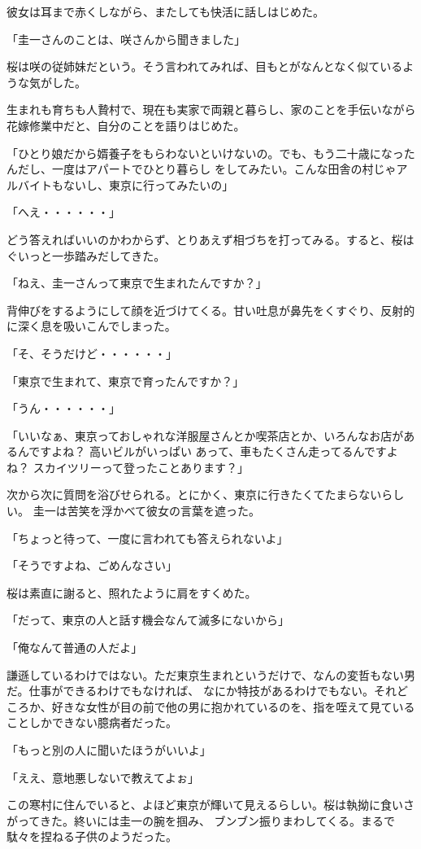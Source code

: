 ﻿\documentclass[book,tate]{jlreq}
\begin{document}
彼女は耳まで赤くしながら、またしても快活に話しはじめた。

「圭一さんのことは、咲さんから聞きました」

桜は咲の従姉妹だという。そう言われてみれば、目もとがなんとなく似ているような気がした。

生まれも育ちも人贄村で、現在も実家で両親と暮らし、家のことを手伝いながら花嫁修業中だと、自分のことを語りはじめた。

「ひとり娘だから婿養子をもらわないといけないの。でも、もう二十歳になったんだし、一度はアパートでひとり暮らし をしてみたい。こんな田舎の村じゃアルバイトもないし、東京に行ってみたいの」

「へえ・・・・・・」

どう答えればいいのかわからず、とりあえず相づちを打ってみる。すると、桜はぐいっと一歩踏みだしてきた。

「ねえ、圭一さんって東京で生まれたんですか？」

背伸びをするようにして顔を近づけてくる。甘い吐息が鼻先をくすぐり、反射的に深く息を吸いこんでしまった。

「そ、そうだけど・・・・・・」

「東京で生まれて、東京で育ったんですか？」

「うん・・・・・・」

「いいなぁ、東京っておしゃれな洋服屋さんとか喫茶店とか、いろんなお店があるんですよね？ 高いビルがいっぱい あって、車もたくさん走ってるんですよね？ スカイツリーって登ったことあります？」

次から次に質問を浴びせられる。とにかく、東京に行きたくてたまらないらしい。 圭一は苦笑を浮かべて彼女の言葉を遮った。

「ちょっと待って、一度に言われても答えられないよ」

「そうですよね、ごめんなさい」

桜は素直に謝ると、照れたように肩をすくめた。

「だって、東京の人と話す機会なんて滅多にないから」

「俺なんて普通の人だよ」

謙遜しているわけではない。ただ東京生まれというだけで、なんの変哲もない男だ。仕事ができるわけでもなければ、 なにか特技があるわけでもない。それどころか、好きな女性が目の前で他の男に抱かれているのを、指を咥えて見ている ことしかできない臆病者だった。

「もっと別の人に聞いたほうがいいよ」

「ええ、意地悪しないで教えてよぉ」

この寒村に住んでいると、よほど東京が輝いて見えるらしい。桜は執拗に食いさがってきた。終いには圭一の腕を掴み、 ブンブン振りまわしてくる。まるで駄々を捏ねる子供のようだった。
\end{document}

